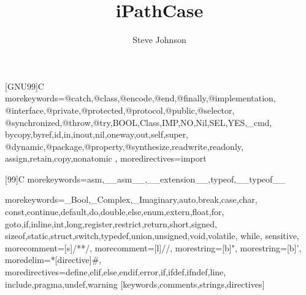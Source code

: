 \documentclass[12pt]{report}
\title{iPathCase}
\author{Steve Johnson}
\begin{document}


\newcommand{\mawapp}{i\-Path\-Case-SMDA\xspace}
\newcommand{\mawappp}{i\-Path\-Case-SMDA's\xspace}
\newcommand{\keggapp}{i\-Path\-Case-KEGG\xspace}
\newcommand{\keggappp}{i\-Path\-Case-KEGG's\xspace}
\newcommand{\ozsoyoglu}{\"{O}zsoyo\u{g}lu\xspace}


[GNU99]{C}
  {morekeywords={@catch,@class,@encode,@end,@finally,@implementation,%
      @interface,@private,@protected,@protocol,@public,@selector,%
      @synchronized,@throw,@try,BOOL,Class,IMP,NO,Nil,SEL,YES,_cmd,%
      bycopy,byref,id,in,inout,nil,oneway,out,self,super,%
      @dynamic,@package,@property,@synthesize,readwrite,readonly,%
      assign,retain,copy,nonatomic%
      },%
   moredirectives={import}%
}%

[99]{C}
  {morekeywords={asm,__asm__,__extension__,typeof,__typeof__}%
}%

%
  {morekeywords={_Bool,_Complex,_Imaginary,auto,break,case,char,%
      const,continue,default,do,double,else,enum,extern,float,for,%
      goto,if,inline,int,long,register,restrict,return,short,signed,%
      sizeof,static,struct,switch,typedef,union,unsigned,void,volatile,%
      while},%
   sensitive,%
   morecomment=[s]{/*}{*/},%
   morecomment=[l]//,%
   morestring=[b]",%
   morestring=[b]',%
   moredelim=*[directive]\#,%
   moredirectives={define,elif,else,endif,error,if,ifdef,ifndef,line,%
      include,pragma,undef,warning}%
}[keywords,comments,strings,directives]%


\lstset{language=[Objective]C, breakindent=40pt, breaklines}


{\singlespacing\lstset{language=[Objective]C}}
{}
{\singlespacing\lstset{language=[xml]}}
{}
\end{document}
